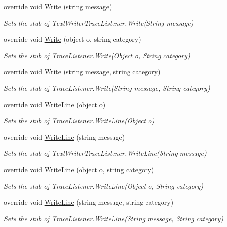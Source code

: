 \begin{DoxyCompactItemize}
override void \hyperlink{class_system_1_1_diagnostics_1_1_fakes_1_1_stub_text_writer_trace_listener_a26d6fa5a0ce195775cd4ae6ae1113193}{Write} (string message)
\begin{DoxyCompactList}\small\item\em Sets the stub of Text\-Writer\-Trace\-Listener.\-Write(\-String message)\end{DoxyCompactList}\item 
override void \hyperlink{class_system_1_1_diagnostics_1_1_fakes_1_1_stub_text_writer_trace_listener_af305b5f717de7101366a7453e8e11e73}{Write} (object o, string category)
\begin{DoxyCompactList}\small\item\em Sets the stub of Trace\-Listener.\-Write(\-Object o, String category)\end{DoxyCompactList}\item 
override void \hyperlink{class_system_1_1_diagnostics_1_1_fakes_1_1_stub_text_writer_trace_listener_a909f1a2a647b23b5027e71382d271ffd}{Write} (string message, string category)
\begin{DoxyCompactList}\small\item\em Sets the stub of Trace\-Listener.\-Write(\-String message, String category)\end{DoxyCompactList}\item 
override void \hyperlink{class_system_1_1_diagnostics_1_1_fakes_1_1_stub_text_writer_trace_listener_a061fcd7d9652f0b753ffa5aa280f89d1}{Write\-Line} (object o)
\begin{DoxyCompactList}\small\item\em Sets the stub of Trace\-Listener.\-Write\-Line(\-Object o)\end{DoxyCompactList}\item 
override void \hyperlink{class_system_1_1_diagnostics_1_1_fakes_1_1_stub_text_writer_trace_listener_a736f575b12d2e6fe7b7beb050ffa2875}{Write\-Line} (string message)
\begin{DoxyCompactList}\small\item\em Sets the stub of Text\-Writer\-Trace\-Listener.\-Write\-Line(\-String message)\end{DoxyCompactList}\item 
override void \hyperlink{class_system_1_1_diagnostics_1_1_fakes_1_1_stub_text_writer_trace_listener_a58f75ead0fff9b0fc6f68eedeae7e6b0}{Write\-Line} (object o, string category)
\begin{DoxyCompactList}\small\item\em Sets the stub of Trace\-Listener.\-Write\-Line(\-Object o, String category)\end{DoxyCompactList}\item 
override void \hyperlink{class_system_1_1_diagnostics_1_1_fakes_1_1_stub_text_writer_trace_listener_ad494aee1131b3e43a48d77784d8a540f}{Write\-Line} (string message, string category)
\begin{DoxyCompactList}\small\item\em Sets the stub of Trace\-Listener.\-Write\-Line(\-String message, String category)\end{DoxyCompactList}\end{DoxyCompactItemize}
